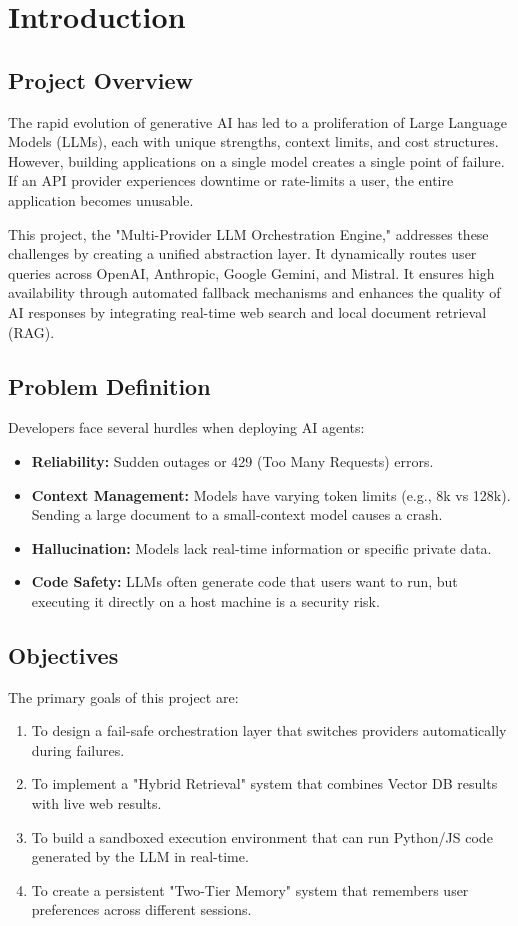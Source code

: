 \documentclass[12pt, a4paper]{report}
\begin{document}
\clearpage
{}
\setcounter{page}{1}

\chapter{Introduction}

\section{Project Overview}
The rapid evolution of generative AI has led to a proliferation of Large Language Models (LLMs), each with unique strengths, context limits, and cost structures. However, building applications on a single model creates a single point of failure. If an API provider experiences downtime or rate-limits a user, the entire application becomes unusable. 

This project, the "Multi-Provider LLM Orchestration Engine," addresses these challenges by creating a unified abstraction layer. It dynamically routes user queries across OpenAI, Anthropic, Google Gemini, and Mistral. It ensures high availability through automated fallback mechanisms and enhances the quality of AI responses by integrating real-time web search and local document retrieval (RAG).

\section{Problem Definition}
Developers face several hurdles when deploying AI agents:
\begin{itemize}
    \item \textbf{Reliability:} Sudden outages or 429 (Too Many Requests) errors.
    \item \textbf{Context Management:} Models have varying token limits (e.g., 8k vs 128k). Sending a large document to a small-context model causes a crash.
    \item \textbf{Hallucination:} Models lack real-time information or specific private data.
    \item \textbf{Code Safety:} LLMs often generate code that users want to run, but executing it directly on a host machine is a security risk.
\end{itemize}

\section{Objectives}
The primary goals of this project are:
\begin{enumerate}
    \item To design a fail-safe orchestration layer that switches providers automatically during failures.
    \item To implement a "Hybrid Retrieval" system that combines Vector DB results with live web results.
    \item To build a sandboxed execution environment that can run Python/JS code generated by the LLM in real-time.
    \item To create a persistent "Two-Tier Memory" system that remembers user preferences across different sessions.
\end{enumerate}
\end{document}
